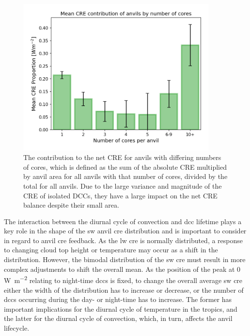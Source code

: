 \begin{figure}[tp]
    \centering
    \includegraphics[width=0.9\textwidth]{figures/chapter4_17.png}
    \caption[
    The contribution to the net CRE for anvils with differing numbers of cores
    ]{
    The contribution to the net CRE for anvils with differing numbers of cores, which is defined as the sum of the absolute CRE multiplied by anvil area for all anvils with that number of cores, divided by the total for all anvils. Due to the large variance and magnitude of the CRE of isolated DCCs, they have a large impact on the net CRE balance despite their small area. 
    }
    \label{fig:S_contribution_to_net_cre}
\end{figure}

The interaction between the diurnal cycle of convection and \acrshort{dcc} lifetime plays a key role in the shape of the \acrshort{sw} anvil \acrshort{cre} distribution and is important to consider in regard to anvil \acrshort{cre} feedback. 
As the \acrshort{lw} \acrshort{cre} is normally distributed, a response to changing cloud top height or temperature may occur as a shift in the distribution. 
However, the bimodal distribution of the \acrshort{sw} \acrshort{cre} must result in more complex adjustments to shift the overall mean. 
As the position of the peak at 0 \,\unit{W m^{-2}} relating to night-time \acrshort{dcc}s is fixed, to change the overall average \acrshort{sw} \acrshort{cre} either the width of the distribution has to increase or decrease, or the number of \acrshort{dcc}s occurring during the day- or night-time has to increase. 
The former has important implications for the diurnal cycle of temperature in the tropics, and the latter for the diurnal cycle of convection, which, in turn, affects the anvil lifecycle.

